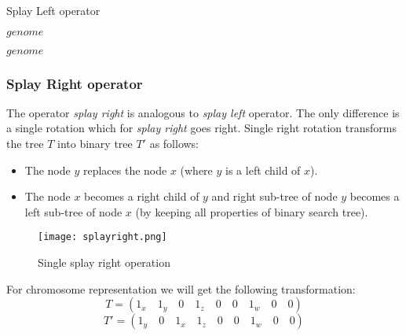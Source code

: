 \documentclass[12pt]{article}
\newlength\singleindent
\newcommand\bindent{%
  \begingroup
  \setlength{\itemindent}{\singleindent}
  \addtolength{\algorithmicindent}{\singleindent}
}
\newcommand\eindent{\endgroup}
\begin{document}
\begin{algorithm}
\scriptsize
\caption{Splay Left operator}
\begin{algorithmic}[]
    \bindent
            \ELSE
            \ENDIF

                    \RETURN $genome$
                \ENDIF
            \ENDIF
        \ENDFOR

        \RETURN $genome$
    \eindent
\end{algorithmic}
\end{algorithm}

\subsubsection{Splay Right operator}

The operator \textit{splay right} is analogous to \textit{splay left} operator. The only difference is a single rotation which for \textit{splay right} goes right.
Single right rotation transforms the tree $T$ into binary tree $T'$ as follows:
\begin{itemize}
\item The node $y$ replaces the node $x$ (where $y$ is a left child of $x$).
\item The node $x$ becomes a right child of $y$ and right sub-tree of node $y$ becomes a left sub-tree of node $x$ (by keeping all properties of binary search tree).
\end{itemize}

\begin{figure}[ht]
\centering
\texttt{[image: splayright.png]}
\caption{Single splay right operation}
\label{fig:splayright}
\end{figure}

For chromosome representation we will get the following transformation:
\[
    T = (1_x \quad 1_y \quad 0 \quad 1_z \quad 0 \quad 0 \quad 1_w \quad 0 \quad 0)
\]
\[
    T' = (1_y \quad 0 \quad 1_x \quad 1_z \quad 0 \quad 0 \quad 1_w \quad 0 \quad 0)
\]
\end{document}
